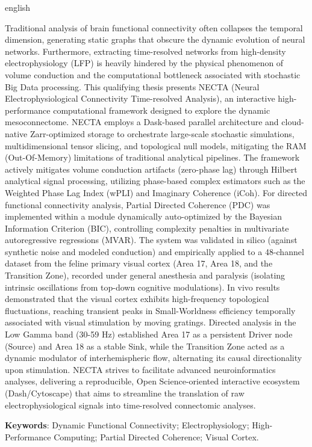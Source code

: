 \begin{resumo}[Abstract]
	\begin{otherlanguage*}{english}
	
	Traditional analysis of brain functional connectivity often collapses the temporal dimension, generating static graphs that obscure the dynamic evolution of neural networks. Furthermore, extracting time-resolved networks from high-density electrophysiology (LFP) is heavily hindered by the physical phenomenon of volume conduction and the computational bottleneck associated with stochastic Big Data processing. This qualifying thesis presents NECTA (Neural Electrophysiological Connectivity Time-resolved Analysis), an interactive high-performance computational framework designed to explore the dynamic mesoconnectome. NECTA employs a Dask-based parallel architecture and cloud-native Zarr-optimized storage to orchestrate large-scale stochastic simulations, multidimensional tensor slicing, and topological null models, mitigating the RAM (Out-Of-Memory) limitations of traditional analytical pipelines. The framework actively mitigates volume conduction artifacts (zero-phase lag) through Hilbert analytical signal processing, utilizing phase-based complex estimators such as the Weighted Phase Lag Index (wPLI) and Imaginary Coherence (iCoh). For directed functional connectivity analysis, Partial Directed Coherence (PDC) was implemented within a module dynamically auto-optimized by the Bayesian Information Criterion (BIC), controlling complexity penalties in multivariate autoregressive regressions (MVAR). The system was validated in silico (against synthetic noise and modeled conduction) and empirically applied to a 48-channel dataset from the feline primary visual cortex (Area 17, Area 18, and the Transition Zone), recorded under general anesthesia and paralysis (isolating intrinsic oscillations from top-down cognitive modulations). In vivo results demonstrated that the visual cortex exhibits high-frequency topological fluctuations, reaching transient peaks in Small-Worldness efficiency temporally associated with visual stimulation by moving gratings. Directed analysis in the Low Gamma band (30-59 Hz) established Area 17 as a persistent Driver node (Source) and Area 18 as a stable Sink, while the Transition Zone acted as a dynamic modulator of interhemispheric flow, alternating its causal directionality upon stimulation. NECTA strives to facilitate advanced neuroinformatics analyses, delivering a reproducible, Open Science-oriented interactive ecosystem (Dash/Cytoscape) that aims to streamline the translation of raw electrophysiological signals into time-resolved connectomic analyses.
	
	\vspace{\onelineskip}
	\noindent 
	\textbf{Keywords}: Dynamic Functional Connectivity; Electrophysiology; High-Performance Computing; Partial Directed Coherence; Visual Cortex.
	\end{otherlanguage*}
\end{resumo}